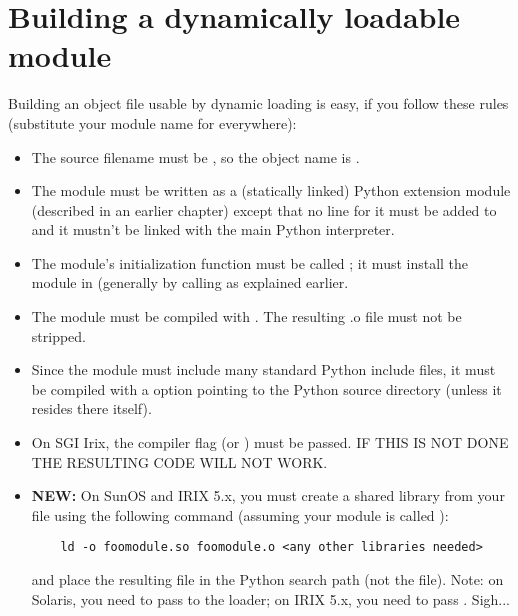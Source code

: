\section{Building a dynamically loadable module}

Building an object file usable by dynamic loading is easy, if you
follow these rules (substitute your module name for 
everywhere):

\begin{itemize}

\item
The source filename must be , so the object
name is .

\item
The module must be written as a (statically linked) Python extension
module (described in an earlier chapter) except that no line for it
must be added to  and it mustn't be linked with the
main Python interpreter.

\item
The module's initialization function must be called ; it
must install the module in  (generally by calling
 as explained earlier.

\item
The module must be compiled with .  The resulting .o file must
not be stripped.

\item
Since the module must include many standard Python include files, it
must be compiled with a  option pointing to the Python source
directory (unless it resides there itself).

\item
On SGI Irix, the compiler flag  (or ) must be passed.
IF THIS IS NOT DONE THE RESULTING CODE WILL NOT WORK.

\item
{\bf NEW:} On SunOS and IRIX 5.x, you must create a shared library
from your  file using the following command (assuming your
module is called ):

\begin{verbatim}
	ld -o foomodule.so foomodule.o <any other libraries needed>
\end{verbatim}

and place the resulting  file in the Python search path (not
the  file).  Note: on Solaris, you need to pass  to
the loader; on IRIX 5.x, you need to pass .  Sigh...

\end{itemize}


